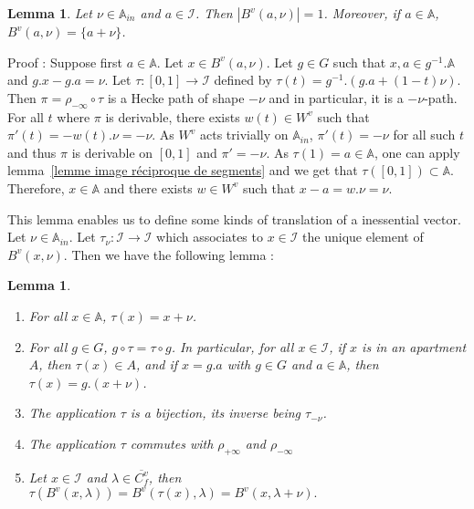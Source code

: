 \documentclass[12pt]{article}
\theoremstyle{plain}
\newtheorem{lemme}[thm]{Lemma}
\theoremstyle{definition}
\newcommand{\A}{\mathbb{A}}
\newcommand{\I}{\mathcal{I}}
\begin{document}
\begin{lemme}\label{lemme partie inessentielle}
 Let $\nu\in\A_{in}$ and $a\in \I$. Then $|B^v(a,\nu)|=1$. Moreover, if $a\in \A$, $B^v(a,\nu)=\{a+\nu\}$. 

\end{lemme} 

Proof : Suppose first $a\in\A$. Let $x\in B^v(a,\nu)$. Let $g\in G$ such that $x,a\in g^{-1}.\A$ and $g.x-g.a=\nu$. Let $\tau:[0,1]\rightarrow \I$ defined by $\tau(t)=g^{-1}.(g.a+(1-t)\nu)$. Then $\pi=\rho_{-\infty}\circ \tau$ is a Hecke path of shape $-\nu$ and in particular,  it is a $-\nu$-path. For all $t$ where $\pi$ is derivable, there exists $w(t)\in W^v$ such that $\pi'(t)=-w(t).\nu=-\nu$. As $W^v$ acts trivially on $\A_{in}$, $\pi'(t)=-\nu$ for all such $t$ and thus $\pi$ is derivable on $[0,1]$ and $\pi'=-\nu$. As $\tau(1)=a\in \A$, one can apply lemma~\ref{lemme image réciproque de segments} and we get that $\tau([0,1])\subset \A$. Therefore, $x\in \A$ and there exists $w\in W^v$ such that $x-a=w.\nu=\nu$.

\vspace{3mm}

This lemma enables us to define some kinds of translation of a inessential vector. Let $\nu\in \A_{in}$. Let $\tau_\nu:\I\rightarrow \I$ which associates to $x\in \I$ the unique element of $B^v(x,\nu)$. Then we have the following lemma : 

\begin{lemme}\label{lemme propriétés des translations}
\begin{enumerate}
Let $\nu\in \A_{in}$ and $\tau=\tau_\nu$. Then :

\item For all $x\in \A$, $\tau(x)=x+\nu$.\label{item tau restreint à A}

\item For all $g\in G$, $g\circ\tau=\tau\circ g$. In particular, for all $x\in \I$, if $x$ is in an apartment $A$,
 then $\tau(x)\in A$, and if $x=g.a$ with $g\in G$ and $a\in\A$, then $\tau(x)=g.(x+\nu)$.\label{item commutation de tau}

\item The application $\tau$ is a bijection, its inverse being $\tau_{-\nu}$.\label{item bijectivité des translations}


\item The application $\tau$ commutes with $\rho_{+\infty}$ and $\rho_{-\infty}$\label{item commutation translation retraction}

\item Let $x\in \I$ and $\lambda\in \overline{C_f^v}$, then $\tau(B^v(x,\lambda))=B^v(\tau(x),\lambda)=B^v(x,\lambda+\nu).$\label{item translation d'une boule}

\end{enumerate}
\end{lemme}
\end{document}
